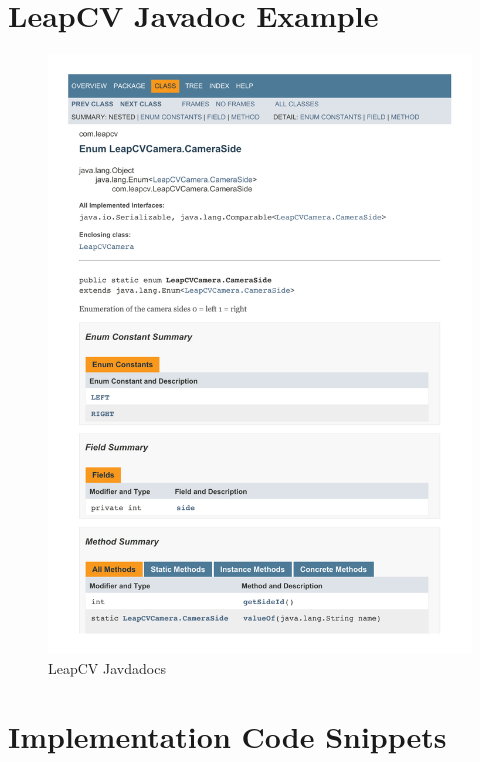 \documentclass[11pt,oneside]{report}
\newcommand\code[1]{\texttt{#1}}
\begin{document}
\begin{appendices}
	\chapter{LeapCV Javadoc Example}
			\begin{figure}
			\centering
    				\includegraphics[width=\textwidth, page=16]{out}
    			\caption{LeapCV Javdadocs \protect {\label{app:javadoc}}}
			\end{figure}	
			
	\chapter{Implementation Code Snippets}
			
			\clearpage
			
			\clearpage
			
			\clearpage
			
			\clearpage
			
			\clearpage
			
			\clearpage
			
	\end{appendices}
	
\end{document}
